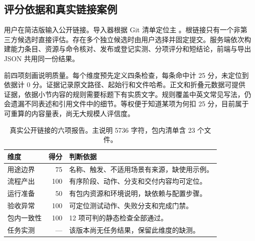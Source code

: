 \documentclass[final,5p,twocolumn,10pt]{elsarticle}
\begin{document}
\subsection{评分依据和真实链接案例}

用户在简洁版输入公开链接。导入器根据 Git 清单定位主 。根链接只有一个非第三方候选时直接评估。存在多个独立候选时由用户选择并固定提交。服务端依次构建能力条目、资源与命令核对、发布或登记实测、分项评分和短结论，前端与导出 JSON 共用同一份结果。

前四项刻画说明质量。每个维度预先定义四条检查，每条命中计 25 分，未定位到依据计 0 分。证据记录原文路径、起始行和文件哈希。正文和折叠元数据可提供证据，依据小节内容的规则需要标题下有实质文字。规则覆盖中英文常见写法，仍会遗漏不同表述和引用文件中的细节。等权便于知道某项为何扣 25 分，目前属于可重算的内容量表，尚无大规模人评信度。

\begin{table}[!ht]
\centering\small
\caption{真实公开链接的六项报告。主说明 5736 字符，包内清单含 23 个文件。}
\label{tab:scored-link}
\begin{tabularx}{\columnwidth}{@{}p{}rX@{}}
\toprule
维度 & 得分 & 判断依据 \\
\midrule
用途边界 & 75 & 名称、触发、不适用场景有来源，缺使用示例。 \\
流程产出 & 100 & 有序阶段、动作、分支和交付内容均可定位。 \\
运行准备 & 50 & 有包内资源和环境说明，缺依赖与配置步骤。 \\
验收异常 & 100 & 可定位测试动作、失败分支和完成门禁。 \\
包内一致性 & 100 & 12 项可判的静态检查全部通过。 \\
任务实测 & --- & 该版本尚无任务结果，保留此维度的缺测。 \\
\bottomrule
\end{tabularx}
\end{table}
\end{document}
